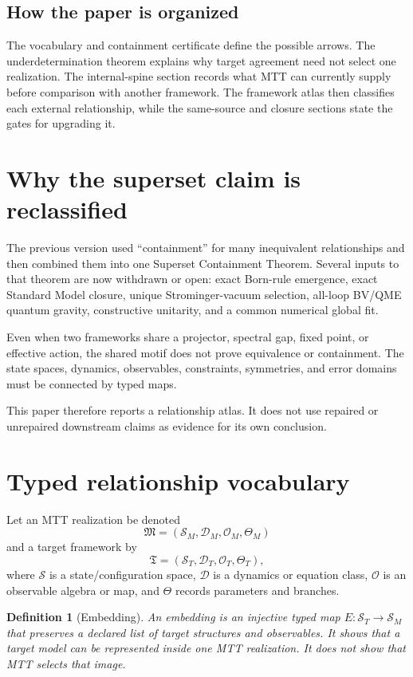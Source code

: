 \documentclass[11pt]{article}
\newtheorem{definition}[theorem]{Definition}
\begin{document}
\subsection{How the paper is organized}

The vocabulary and containment certificate define the possible arrows.
The underdetermination theorem explains why target agreement need not select
one realization.  The internal-spine section records what MTT can currently
supply before comparison with another framework.  The framework atlas then
classifies each external relationship, while the same-source and closure
sections state the gates for upgrading it.

\section{Why the superset claim is reclassified}

The previous version used ``containment'' for many inequivalent relationships
and then combined them into one Superset Containment Theorem. Several inputs to
that theorem are now withdrawn or open: exact Born-rule emergence, exact
Standard Model closure, unique Strominger-vacuum selection, all-loop BV/QME
quantum gravity, constructive unitarity, and a common numerical global fit.

Even when two frameworks share a projector, spectral gap, fixed point, or
effective action, the shared motif does not prove equivalence or containment.
The state spaces, dynamics, observables, constraints, symmetries, and error
domains must be connected by typed maps.

This paper therefore reports a relationship atlas. It does not use repaired or
unrepaired downstream claims as evidence for its own conclusion.

\section{Typed relationship vocabulary}

Let an MTT realization be denoted
\[
 \mathfrak M=(\mathcal S_M,\mathcal D_M,\mathcal O_M,\Theta_M)
\]
and a target framework by
\[
 \mathfrak T=(\mathcal S_T,\mathcal D_T,\mathcal O_T,\Theta_T),
\]
where $\mathcal S$ is a state/configuration space, $\mathcal D$ is a dynamics
or equation class, $\mathcal O$ is an observable algebra or map, and $\Theta$
records parameters and branches.

\begin{definition}[Embedding]
An embedding is an injective typed map $E:\mathcal S_T\to\mathcal S_M$ that
preserves a declared list of target structures and observables. It shows that
a target model can be represented inside one MTT realization. It does not show
that MTT selects that image.
\end{definition}
\end{document}
